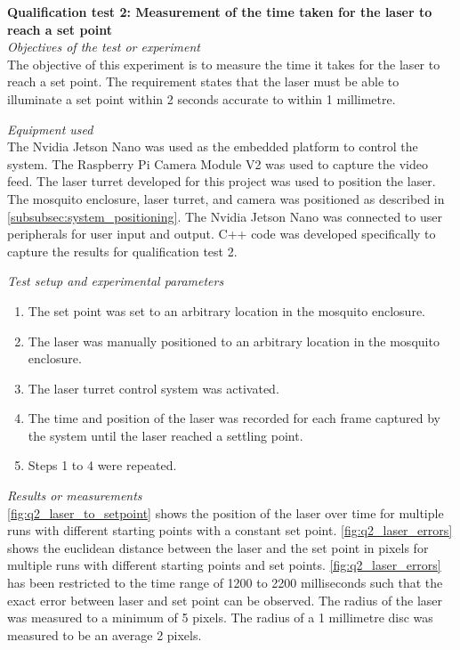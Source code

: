 \FloatBarrier
\textbf{Qualification test 2: Measurement of the time taken for the laser to reach a set point}\\
\textit{Objectives of the test or experiment}\\
The objective of this experiment is to measure the time it takes for the laser to reach a set point. The requirement states that the laser must be able to illuminate a set point within 2 seconds accurate to within 1 millimetre.

\textit{Equipment used}\\
The Nvidia Jetson Nano was used as the embedded platform to control the system. The Raspberry Pi Camera Module V2 was used to capture the video feed. The laser turret developed for this project was used to position the laser. The mosquito enclosure, laser turret, and camera was positioned as described in \autoref{subsubsec:system_positioning}. The Nvidia Jetson Nano was connected to user peripherals for user input and output. C++ code was developed specifically to capture the results for qualification test 2.

\textit{Test setup and experimental parameters}
\begin{enumerate}
  \item The set point was set to an arbitrary location in the mosquito enclosure.
  \item The laser was manually positioned to an arbitrary location in the mosquito enclosure.
  \item The laser turret control system was activated.
  \item The time and position of the laser was recorded for each frame captured by the system until the laser reached a settling point.
  \item Steps 1 to 4 were repeated.
\end{enumerate}

\textit{Results or measurements}\\
\autoref{fig:q2_laser_to_setpoint} shows the position of the laser over time for multiple runs with different starting points with a constant set point. \autoref{fig:q2_laser_errors} shows the euclidean distance between the laser and the set point in pixels for multiple runs with different starting points and set points. \autoref{fig:q2_laser_errors} has been restricted to the time range of 1200 to 2200 milliseconds such that the exact error between laser and set point can be observed. The radius of the laser was measured to a minimum of 5 pixels. The radius of a 1 millimetre disc was measured to be an average 2 pixels.

